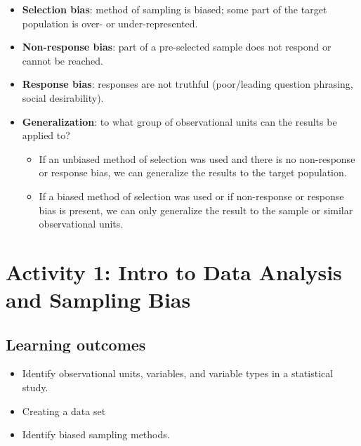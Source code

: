 \documentclass[
]{report}
\begin{document}
\begin{itemize}
  \begin{itemize}
  \item
    \textbf{Selection bias}: method of sampling is biased; some part of the target population is over- or under-represented.
  \item
    \textbf{Non-response bias}: part of a pre-selected sample does not respond or cannot be reached.
  \item
    \textbf{Response bias}: responses are not truthful (poor/leading question phrasing, social desirability).
  \end{itemize}
\end{itemize}

\newpage

\begin{itemize}
\item
  \textbf{Generalization}: to what group of observational units can the results be applied to?

  \begin{itemize}
  \item
    If an unbiased method of selection was used and there is no non-response or response bias, we can generalize the results to the target population.
  \item
    If a biased method of selection was used or if non-response or response bias is present, we can only generalize the result to the sample or similar observational units.
  \end{itemize}
\end{itemize}

\newpage

\section{Activity 1: Intro to Data Analysis and Sampling Bias}\label{activity-1-intro-to-data-analysis-and-sampling-bias}


\subsection{Learning outcomes}\label{learning-outcomes}

\begin{itemize}
\item
  Identify observational units, variables, and variable types in a statistical study.
\item
  Creating a data set
\item
  Identify biased sampling methods.
\end{itemize}
\end{document}
